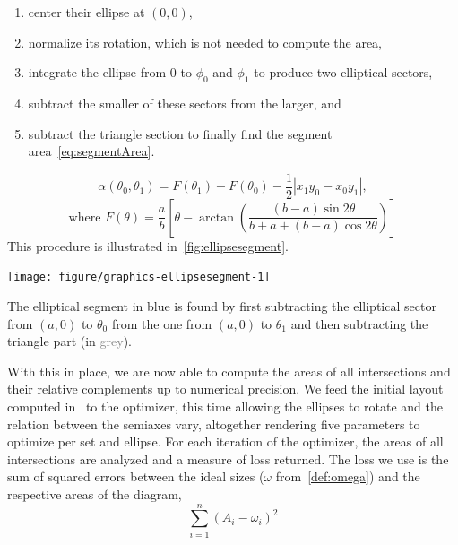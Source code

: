 \documentclass[
  a4paper,
  nofonts,
  nobib,
  nohyper,
  openany
]{tufte-book}\usepackage[]{graphicx}\usepackage[]{color}
\newenvironment{knitrout}{}{} %
\begin{document}
\begin{enumerate}
\item center their ellipse at $(0, 0)$,
\item normalize its rotation, which is not needed to compute the area,
\item integrate the ellipse from $0$ to $\phi_0$ and $\phi_1$ to produce two elliptical sectors,
\item subtract the smaller of these sectors from the larger, and
\item subtract the triangle section to finally find the segment area~\eqref{eq:segmentArea}.
\end{enumerate}

\begin{equation*}
\alpha(\theta_0, \theta_1) = F(\theta_1) - F(\theta_0) -
\frac{1}{2}\left|x_1y_0 - x_0y_1\right|,
\label{eq:segmentArea}
\end{equation*}
\[
\text{where } F(\theta) = \frac{a}{b}\left[ \theta -
\arctan{\left(\frac{(b - a)\sin{2\theta}}{b + a +(b - a )\cos{2\theta}} \right)}
\right]
\]
This procedure is illustrated in~\cref{fig:ellipsesegment}.

\begin{marginfigure}
\begin{knitrout}
\color{fgcolor}

{\centering \texttt{[image: figure/graphics-ellipsesegment-1]} 

}



\end{knitrout}
\caption{The elliptical segment in \textcolor{SteelBlue4}{blue} is found by first subtracting the elliptical sector from $(a, 0)$ to $\theta_0$ from the one from $(a, 0)$ to $\theta_1$ and then subtracting the triangle part (in \textcolor{Grey}{grey}).}
\label{fig:ellipsesegment}
\end{marginfigure}

With this in place, we are now able to compute the areas of all intersections and their relative complements up to numerical precision. We feed the initial layout computed in~ to the optimizer, this time allowing the ellipses to rotate and the relation between the semiaxes vary, altogether rendering five parameters to optimize per set and ellipse. For each iteration of the optimizer, the areas of all intersections are analyzed and a measure of loss returned. The loss we use is the sum of squared errors between the ideal sizes ($\omega$ from~\cref{def:omega}) and the respective areas of the diagram,
\begin{equation}
\sum_{i=1}^{n}  (A_i-\omega_i)^2
\label{eq:loss}
\end{equation}
\end{document}
